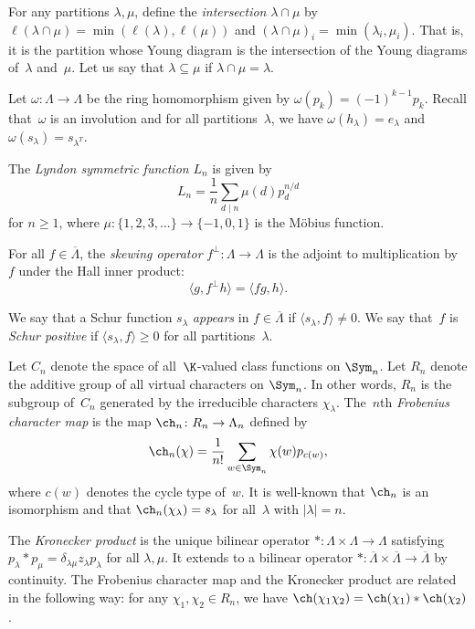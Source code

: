 For any partitions $\lambda, \mu$, define the \emph{intersection} $\lambda \cap \mu$ by $\ell(\lambda \cap \mu) = \min(\ell(\lambda), \ell(\mu))$ and $(\lambda \cap \mu)_i = \min(\lambda_i, \mu_i)$. That is, it is the partition whose Young diagram is the intersection of the Young diagrams of~$\lambda$ and~$\mu$. Let us say that $\lambda \subseteq \mu$ if $\lambda \cap \mu = \lambda$.

Let $\omega \colon \Lambda \to \Lambda$ be the ring homomorphism given by $\omega(p_k) = (-1)^{k-1} p_k$. Recall that~$\omega$ is an involution and for all partitions~$\lambda$, we have $\omega(h_\lambda) = e_\lambda$ and $\omega(s_\lambda) = s_{\lambda^T}$.

The \emph{Lyndon symmetric function} $L_n$ is given by \[L_n = \frac{1}{n} \sum_{d \mid n} \mu(d) p_d^{n/d}\] for $n \geq 1$, where $\mu \colon \{1, 2, 3, \ldots\} \to \{-1, 0, 1\}$ is the M\"obius function.

For all $f \in \overline{\Lambda}$, the \emph{skewing operator} $f^\perp \colon \Lambda \to \Lambda$ is the adjoint to multiplication by~$f$ under the Hall inner product: \[\langle g, f^\perp h \rangle = \langle fg, h \rangle.\]

We say that a Schur function $s_\lambda$ \emph{appears} in $f \in \overline{\Lambda}$ if $\langle s_\lambda, f \rangle \neq 0$. We say that~$f$ is \emph{Schur positive} if $\langle s_\lambda, f \rangle \geq 0$ for all partitions~$\lambda$.

Let $C_n$ denote the space of all~$\K$-valued class functions on $\Sym_n$. Let $R_n$ denote the additive group of all virtual characters on $\Sym_n$. In other words, $R_n$ is the subgroup of~$C_n$ generated by the irreducible characters $\chi_\lambda$. The~$n$th \emph{Frobenius character map} is the map $\ch_n \colon R_n \to \Lambda_n$ defined by \[\ch_n(\chi) = \frac{1}{n!}\sum_{w \in \Sym_n} \chi(w) p_{c(w)},\] where $c(w)$ denotes the cycle type of~$w$. It is well-known that $\ch_n$ is an isomorphism and that $\ch_n(\chi_\lambda) = s_\lambda$ for all~$\lambda$ with $|\lambda| = n$.

The \emph{Kronecker product} is the unique bilinear operator $\ast \colon \Lambda \times \Lambda \to \Lambda$ satisfying $p_\lambda \ast p_\mu = \delta_{\lambda \mu} z_\lambda p_\lambda$ for all $\lambda, \mu$. It extends to a bilinear operator $\ast \colon \overline{\Lambda} \times \overline{\Lambda} \to \overline{\Lambda}$ by continuity. The Frobenius character map and the Kronecker product are related in the following way: for any $\chi_1, \chi_2 \in R_n$, we have $\ch(\chi_1 \chi_2) = \ch(\chi_1) \ast \ch(\chi_2)$.

